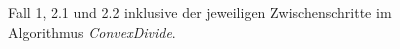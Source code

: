 \documentclass[ngerman]{seminarbeitrag}
\begin{document}
\begin{figure}[h]
    \qquad
    \centering
    \caption{Fall 1, 2.1 und 2.2 inklusive der jeweiligen Zwischenschritte im Algorithmus \mbox{\textit{ConvexDivide}}.}
    \label{zweites beispiel}
\end{figure}
\end{document}
